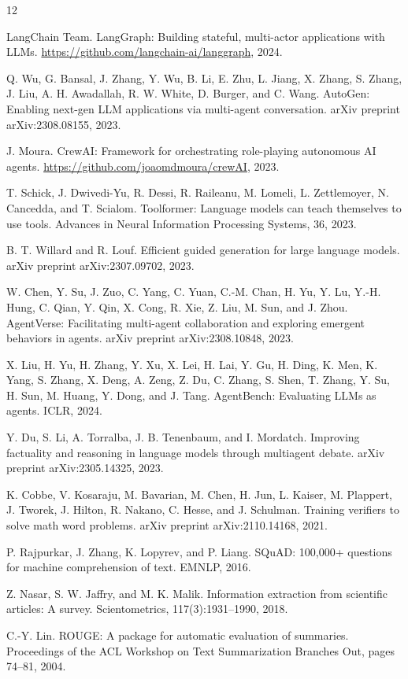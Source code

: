 \documentclass[11pt]{article}
\begin{document}
\begin{thebibliography}{12}

LangChain Team.
\newblock LangGraph: Building stateful, multi-actor applications with LLMs.
\newblock \url{https://github.com/langchain-ai/langgraph}, 2024.

Q. Wu, G. Bansal, J. Zhang, Y. Wu, B. Li, E. Zhu, L. Jiang, X. Zhang, S. Zhang, J. Liu, A. H. Awadallah, R. W. White, D. Burger, and C. Wang.
\newblock AutoGen: Enabling next-gen LLM applications via multi-agent conversation.
\newblock arXiv preprint arXiv:2308.08155, 2023.

J. Moura.
\newblock CrewAI: Framework for orchestrating role-playing autonomous AI agents.
\newblock \url{https://github.com/joaomdmoura/crewAI}, 2023.

T. Schick, J. Dwivedi-Yu, R. Dessi, R. Raileanu, M. Lomeli, L. Zettlemoyer, N. Cancedda, and T. Scialom.
\newblock Toolformer: Language models can teach themselves to use tools.
\newblock Advances in Neural Information Processing Systems, 36, 2023.

B. T. Willard and R. Louf.
\newblock Efficient guided generation for large language models.
\newblock arXiv preprint arXiv:2307.09702, 2023.

W. Chen, Y. Su, J. Zuo, C. Yang, C. Yuan, C.-M. Chan, H. Yu, Y. Lu, Y.-H. Hung, C. Qian, Y. Qin, X. Cong, R. Xie, Z. Liu, M. Sun, and J. Zhou.
\newblock AgentVerse: Facilitating multi-agent collaboration and exploring emergent behaviors in agents.
\newblock arXiv preprint arXiv:2308.10848, 2023.

X. Liu, H. Yu, H. Zhang, Y. Xu, X. Lei, H. Lai, Y. Gu, H. Ding, K. Men, K. Yang, S. Zhang, X. Deng, A. Zeng, Z. Du, C. Zhang, S. Shen, T. Zhang, Y. Su, H. Sun, M. Huang, Y. Dong, and J. Tang.
\newblock AgentBench: Evaluating LLMs as agents.
\newblock ICLR, 2024.

Y. Du, S. Li, A. Torralba, J. B. Tenenbaum, and I. Mordatch.
\newblock Improving factuality and reasoning in language models through multiagent debate.
\newblock arXiv preprint arXiv:2305.14325, 2023.

K. Cobbe, V. Kosaraju, M. Bavarian, M. Chen, H. Jun, L. Kaiser, M. Plappert, J. Tworek, J. Hilton, R. Nakano, C. Hesse, and J. Schulman.
\newblock Training verifiers to solve math word problems.
\newblock arXiv preprint arXiv:2110.14168, 2021.

P. Rajpurkar, J. Zhang, K. Lopyrev, and P. Liang.
\newblock SQuAD: 100,000+ questions for machine comprehension of text.
\newblock EMNLP, 2016.

Z. Nasar, S. W. Jaffry, and M. K. Malik.
\newblock Information extraction from scientific articles: A survey.
\newblock Scientometrics, 117(3):1931--1990, 2018.

C.-Y. Lin.
\newblock ROUGE: A package for automatic evaluation of summaries.
\newblock Proceedings of the ACL Workshop on Text Summarization Branches Out, pages 74--81, 2004.

\end{thebibliography}
\end{document}
